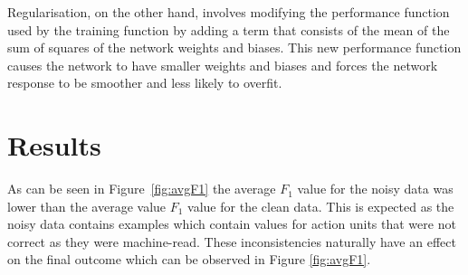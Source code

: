 \documentclass[10pt,a4paper]{article}
\begin{document}
Regularisation, on the other hand, involves modifying the performance function used by the training function by adding a term that consists of the mean of the sum of squares of the network weights and biases. This new performance function causes the network to have smaller weights and biases and forces the network response to be smoother and less likely to overfit.

\section{Results}

As can be seen in Figure~\ref{fig:avgF1} the average $F_1$ value for the noisy data was lower than the average value $F_1$ value for the clean data. This is expected as the noisy data contains examples which contain values for action units that were not correct as they were machine-read. These inconsistencies naturally have an effect on the final outcome which can be observed in Figure \ref{fig:avgF1}.
\end{document}
